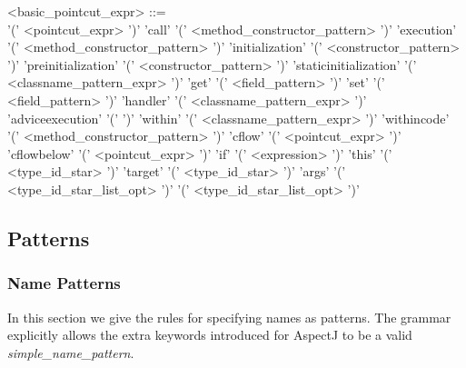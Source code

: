 \begin{minipage}{6in}
\begin{blue}
\begin{grammar}
<basic_pointcut_expr> ::= \hspace{1in} \\
       '(' <pointcut_expr> ')'
\alt   'call' '(' <method_constructor_pattern> ')'
\alt   'execution' '(' <method_constructor_pattern> ')'
\alt   'initialization' '(' <constructor_pattern> ')'
\alt   'preinitialization' '(' <constructor_pattern> ')'
\alt   'staticinitialization' '(' <classname_pattern_expr> ')'
\alt   'get' '(' <field_pattern> ')'
\alt   'set' '(' <field_pattern> ')'
\alt   'handler' '(' <classname_pattern_expr> ')'
\alt   'adviceexecution' '(' ')'
\alt   'within' '(' <classname_pattern_expr> ')'
\alt   'withincode' '(' <method_constructor_pattern> ')'
\alt   'cflow' '(' <pointcut_expr> ')'
\alt   'cflowbelow' '(' <pointcut_expr> ')'
\alt   'if' '(' {\red <expression> } ')'
\alt   'this' '(' <type_id_star> ')'
\alt   'target' '(' <type_id_star> ')'
\alt   'args' '(' <type_id_star_list_opt> ')'
 '(' <type_id_star_list_opt> ')'
\end{grammar}
\end{blue}
\end{minipage}


\subsection{Patterns}

\subsubsection{Name Patterns \label{SEC:NamePatterns}}

In this section we give the rules for specifying names as
patterns.   
The grammar explicitly allows the extra keywords introduced for
AspectJ to be a valid {\em simple\_name\_pattern}.

